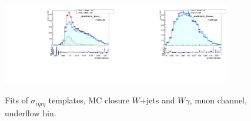 \begin{figure}[htb]
  \begin{center}
   \includegraphics[width=0.45\textwidth]{../figs/figs_v11/MUON_WGamma/MCclosureWjetsPlusWg/c_TEMPL_SIHIH_UNblind__phoEt10to15__Barrel__RooFit_MCclosure.pdf}\includegraphics[width=0.45\textwidth]{../figs/figs_v11/MUON_WGamma/MCclosureWjetsPlusWg/c_TEMPL_SIHIH_UNblind__phoEt10to15__Endcap__RooFit_MCclosure.pdf}\\
  \label{fig:templateFits_MCclosureWjetsPlusWg_SIHIH_MUON_0}
  \caption{Fits of $\sigma_{i \eta i \eta}$ templates, MC closure $W$+jets and $W\gamma$, muon channel, underflow bin.}
  \end{center}
\end{figure}

\

